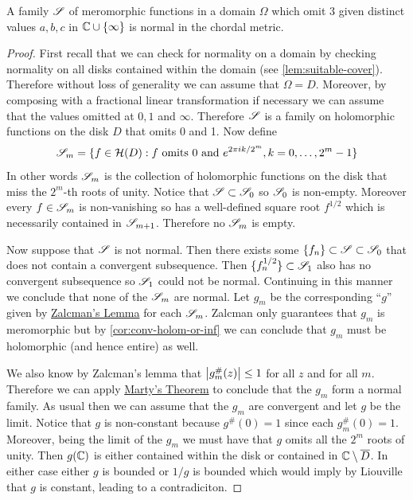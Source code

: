 \begin{theorem}\label{thm:montel-big-thm}
    A family $\mathscr{S}$ of meromorphic functions in a domain $\Omega$ which omit 3 given distinct values $a, b, c$ in $\mathbb{C} \cup \{\infty\}$  is normal in the chordal metric.
\end{theorem}
\begin{proof}
    First recall that we can check for normality on a domain by checking normality on all disks contained within the domain (see \autoref{lem:suitable-cover}). Therefore without loss of generality we can assume that $\Omega = D$. Moreover, by composing with a fractional linear transformation if necessary we can assume that the values omitted at $0, 1$ and $\infty$. Therefore $\mathscr{S}$ is a family on holomorphic functions on the disk $D$ that omits 0 and 1. Now define
    $$\mathscr{S}_m = \{f \in \mathcal{H}(D) : f \text{ omits } 0 \text{ and } e^{2\pi i k/2^m}, k = 0, \dots, 2^m - 1\}$$
    In other words $\mathscr{S}_m$ is the collection of holomorphic functions on the disk that miss the $2^m$-th roots of unity. Notice that $\mathscr{S} \subset \mathscr{S}_0$ so $\mathscr{S}_0$ is non-empty. Moreover every $f \in \mathscr{S}_m$ is non-vanishing so has a well-defined square root $f^{1/2}$ which is necessarily contained in $\mathscr{S}_{m + 1}$. Therefore no $\mathscr{S}_m$ is empty.

    Now suppose that $\mathscr{S}$ is not normal. Then there exists some $\{f_n\} \subset \mathscr{S} \subset \mathscr{S}_0$ that does not contain a convergent subsequence. Then $\{f_n^{1/2}\} \subset \mathscr{S}_1$ also has no convergent subsequence so $\mathscr{S}_1$ could not be normal. Continuing in this manner we conclude that none of the $\mathscr{S}_m$ are normal. Let $g_m$ be the corresponding ``$g$'' given by \hyperref[lem:zalcman]{Zalcman's Lemma} for each $\mathscr{S}_m$. Zalcman only guarantees that $g_m$ is meromorphic but by \autoref{cor:conv-holom-or-inf} we can conclude that $g_m$ must be holomorphic (and hence entire) as well. 
    
    We also know by Zalcman's lemma that $\left|g_m^\#(z)\right| \leq 1$ for all $z$ and for all $m$. Therefore we can apply \hyperref[thm:marty]{Marty's Theorem} to conclude that the $g_m$ form a normal family. As usual then we can assume that the $g_m$ are convergent and let $g$ be the limit. Notice that $g$ is non-constant because $g^\#(0) = 1$ since each $g_m^\#(0) = 1$. Moreover, being the limit of the $g_m$ we must have that $g$ omits all the $2^m$ roots of unity. Then $g(\mathbb{C})$ is either contained within the disk or contained in $\mathbb{C} \setminus \overline{D}$. In either case either $g$ is bounded or $1/g$ is bounded which would imply by Liouville that $g$ is constant, leading to a contradiciton.
\end{proof}

